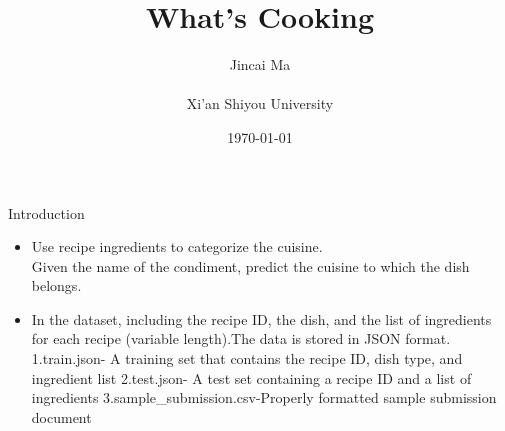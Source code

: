 \documentclass[
 size=14pt,
 paper=smartboard,  %
 mode=present, 		%
 display=slides, 	%
 style=tuliplab,  	%
 pauseslide,
 fleqn,leqno]{powerdot}
\title{What's Cooking}
\author{
   Jincai Ma
\\
\\Xi'an Shiyou University}
\date{\today}
\begin{document}
\maketitle







\begin{slide}{Introduction}
\begin{center}

{
\begin{itemize}
\item 
Use recipe ingredients to categorize the cuisine.\\
Given the name of the condiment, predict the cuisine to which the dish belongs.
\item In the dataset,  including the recipe ID, the dish, and the list of ingredients for each recipe (variable length).The data is stored in JSON format. \\
1.train.json- A training set that contains the recipe ID, dish type, and ingredient list
2.test.json- A test set containing a recipe ID and a list of ingredients
3.sample_submission.csv-Properly formatted sample submission document
\end{itemize}
}

\end{center}
\bigskip
\begin{center}

\end{center}
\bigskip



\end{slide}
\end{document}

